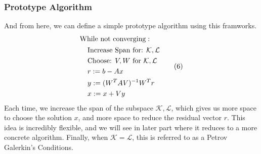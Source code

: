 \documentclass[]{article}
\theoremstyle{definition}
\begin{document}
        \subsubsection{Prototype Algorithm}
            And from here, we can define a simple prototype algorithm using this framworks. 
            \begin{align}
            \begin{aligned}
                & \text{While not converging}: 
                \\&\hspace{1.1em}
                        \begin{aligned}
                        &\text{Increase Span for: } \mathcal{K, L}
                        \\
                        &\text{Choose: } V, W \text{ for } \mathcal{K}, \mathcal{L}
                        \\
                        & r := b - Ax
                        \\
                        & y := (W^TAV)^{-1}W^Tr
                        \\
                        & x := x + Vy
                    \end{aligned}
            \end{aligned}\tag{6}
            \end{align}
            Each time, we increase the span of the subspace $\mathcal K, \mathcal L$, which gives us more space to choose the solution $x$, and more space to reduce the residual vector $r$. This idea is incredibly flexible, and we will see in later part where it reduces to a more concrete algorithm. Finally, when $\mathcal K = \mathcal L$, this is referred to as a Petrov Galerkin's Conditions. 
        
\end{document}
